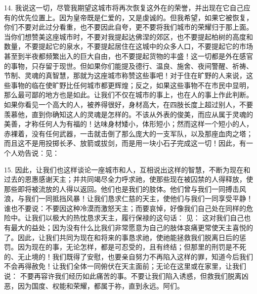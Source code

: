 14. 我说这一切，尽管我期望这城市将再次恢复这外在的荣誉，并出现在它自己应有的优先位置上。因为皇帝既是仁爱的，又是虔诚的。但我希望，如果它被恢复，你们不要对此过分看重，也不要因此自夸，更不要将我们城市的荣耀归于那上面。当你们想赞美这座城市时，不要对我提起达佛涅的郊区，也不要提起柏树的高度和数量，不要提起它的泉水，不要提起居住在这城中的众多人口，不要提起它的市场甚至到半夜都频繁出入的巨大自由，也不要提起货物的丰盛！这一切都是外在感官的事物，只存留于现世。但如果你们能提及德行、温良、施舍、夜间警醒、祈祷、节制、灵魂的真智慧，那就为这座城市称赞这些事吧！对于住在旷野的人来说，这些事物的临在使旷野比任何城市都更辉煌；反之，如果这些事物不在市民中显明，那么最可鄙的地方也是如此。让我们不仅在城市的事上，也在人的事上作此判断。如果你看见一个高大的人，被养得很好，身材高大，在四肢长度上超过别人，不要羡慕他，直到你确知这人的灵魂是怎样的。不该从外表的俊美，而应从属于灵魂的美善，才称任何人为有福的！达味身材矮小，体形短小；然而这样一个短小的人，赤裸着，没有任何武器，一击就击倒了那么庞大的一支军队，以及那座血肉之塔；而且这不是用投掷长矛、放箭或拔剑，而是用一块小石子完成这一切！因此，有一个人劝告说：见：\par

15. 因此，让我们也这样谈论一座城市和人，互相说出这样的智慧，不断为现在和过去的恩惠感谢天主；并共同竭尽全力呼求祂，使那些现在被囚禁的人得释放，使那些即将被流放的人得以返回。他们也是我们的肢体。他们曾与我们一同搏击风浪，与我们一同抵挡风暴！让我们恳求仁慈的天主，使他们与我们一同享受平静！谁也不要说：不要因这种冷漠而激怒天主；而要哀悼，好像我们自己处在同样的危险中。让我们以极大的热忱恳求天主，履行保禄的这句话： 见： 这对我们自己也有最大的益处；因为没有什么比我们非常愿意为自己的肢体哀痛更常使天主喜悦的了。因此，让我们共同为现在和将来的事恳求祂，使祂能拯救我们脱离日后的惩罚。因为现在的事，无论怎样，都是可忍受的，且有终结；但那里的刑罚是不死的、无止境的！我们既得了安慰，也要亲自努力不再陷入这样的罪，知道今后我们不会再得赦免！让我们全体一同俯伏在天主面前；无论在这里或在家里，让我们说：  不要再容许我们经历如此痛苦的事。不要让我们陷入诱惑，但救我们脱离凶恶，因为国度、权能和荣耀，都属于祢，直到永远。阿们。\par

